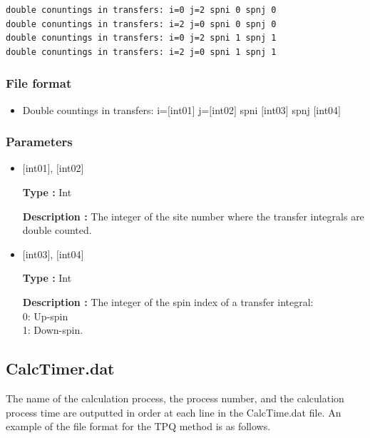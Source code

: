 \begin{minipage}{12.5cm}
\begin{screen}
\begin{verbatim}
double conuntings in transfers: i=0 j=2 spni 0 spnj 0  
double conuntings in transfers: i=2 j=0 spni 0 spnj 0  
double conuntings in transfers: i=0 j=2 spni 1 spnj 1  
double conuntings in transfers: i=2 j=0 spni 1 spnj 1  
\end{verbatim}
\end{screen}
\end{minipage}

\subsubsection{File format}
 \begin{itemize}
   \item  Double countings in transfers: i=$[$int01$]$ j=$[$int02$]$ spni $[$int03$]$  spnj $[$int04$]$   
 \end{itemize}
 
\subsubsection{Parameters}
 \begin{itemize}

    \item  $[$int01$]$, $[$int02$]$
   
    {\bf Type :} Int

   {\bf Description :} The integer of the site number where the transfer integrals are double counted.
      
         \item  $[$int03$]$, $[$int04$]$  
   
    {\bf Type :} Int

   {\bf Description :} The integer of the spin index of a transfer integral: \\
   0: Up-spin\\
   1: Down-spin.\\ 
\end{itemize}

\newpage
\subsection{CalcTimer.dat}
The name of the calculation process, the process number, and the calculation process time
are outputted in order at each line in the CalcTime.dat file. An example of the file format for the TPQ method is as follows.\\

